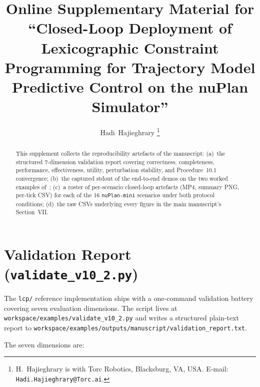 \documentclass[journal, twocolumn]{IEEEtran}
\begin{document}
\title{Online Supplementary Material for ``Closed-Loop Deployment of Lexicographic Constraint Programming for Trajectory Model Predictive Control on the nuPlan Simulator''}

\author{Hadi~Hajieghrary%
\thanks{H.~Hajieghrary is with Torc Robotics, Blacksburg, VA, USA. E-mail: \texttt{Hadi.Hajieghrary@Torc.ai}.}
}

\maketitle

\begin{abstract}
This supplement collects the reproducibility artefacts of the manuscript: (a)~the structured 7-dimension validation report covering correctness, completeness, performance, effectiveness, utility, perturbation stability, and Procedure~10.1 convergence; (b)~the captured stdout of the end-to-end demos on the two worked examples of~\cite[\S11]{lcp2025}; (c)~a roster of per-scenario closed-loop artefacts (MP4, summary PNG, per-tick CSV) for each of the 16 \texttt{nuPlan-mini} scenarios under both protocol conditions; (d)~the raw CSVs underlying every figure in the main manuscript's Section~VII.
\end{abstract}

\section{Validation Report (\texttt{validate\_v10\_2.py})}
\label{sec:supp:validation}

The \texttt{lcp/} reference implementation ships with a one-command validation battery covering seven evaluation dimensions. The script lives at \texttt{workspace/examples/validate\_v10\_2.py} and writes a structured plain-text report to \texttt{workspace/examples/outputs/manuscript/\allowbreak validation\_report.txt}.

The seven dimensions are:
\end{document}
